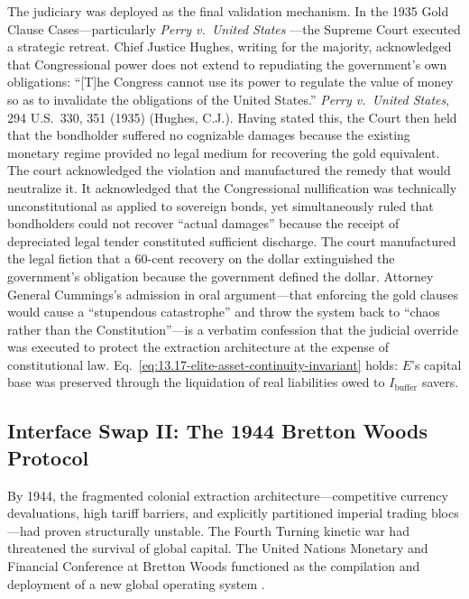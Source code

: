 The judiciary was deployed as the final validation mechanism. In the 1935 Gold Clause Cases---particularly \textit{Perry v.\ United States} \cite{perry_v_us_1935}---the Supreme Court executed a strategic retreat. Chief Justice Hughes, writing for the majority, acknowledged that Congressional power does not extend to repudiating the government's own obligations: ``[T]he Congress cannot use its power to regulate the value of money so as to invalidate the obligations of the United States.'' \textit{Perry v.\ United States}, 294 U.S.\ 330, 351 (1935) (Hughes, C.J.). Having stated this, the Court then held that the bondholder suffered no cognizable damages because the existing monetary regime provided no legal medium for recovering the gold equivalent. The court acknowledged the violation and manufactured the remedy that would neutralize it. It acknowledged that the Congressional nullification was technically unconstitutional as applied to sovereign bonds, yet simultaneously ruled that bondholders could not recover ``actual damages'' because the receipt of depreciated legal tender constituted sufficient discharge. The court manufactured the legal fiction that a 60-cent recovery on the dollar extinguished the government's obligation because the government defined the dollar. Attorney General Cummings's admission in oral argument---that enforcing the gold clauses would cause a ``stupendous catastrophe'' and throw the system back to ``chaos rather than the Constitution''---is a verbatim confession that the judicial override was executed to protect the extraction architecture at the expense of constitutional law. Eq.~\eqref{eq:13.17-elite-asset-continuity-invariant} holds: $E$'s capital base was preserved through the liquidation of real liabilities owed to $I_{\text{buffer}}$ savers.

\subsection*{Interface Swap II: The 1944 Bretton Woods Protocol}
\label{subsec:swap_1944}

By 1944, the fragmented colonial extraction architecture---competitive currency devaluations, high tariff barriers, and explicitly partitioned imperial trading blocs---had proven structurally unstable. The Fourth Turning kinetic war had threatened the survival of global capital. The United Nations Monetary and Financial Conference at Bretton Woods functioned as the compilation and deployment of a new global operating system \cite{bordo_eichengreen_1993}.

